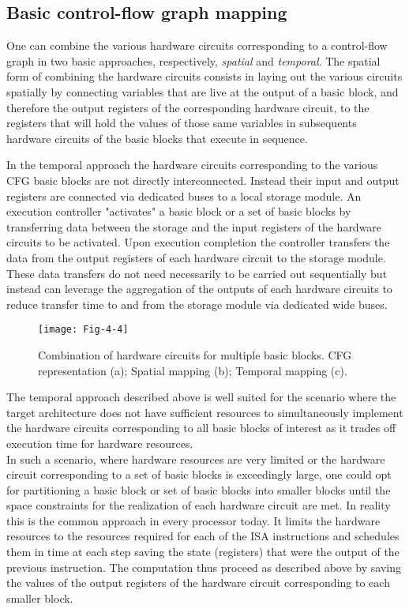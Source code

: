 \subsection{Basic control-flow graph mapping}
\label{sec:cfg_mapping}

One can combine the various hardware circuits corresponding
to a control-flow graph in two basic approaches, respectively,
{\em spatial} and {\em temporal}. 
The spatial form of combining the hardware circuits consists 
in laying out the various circuits spatially by connecting 
variables that are live at the output of a basic block, 
and therefore the output registers of the 
corresponding hardware circuit, to the registers that 
will hold the values of those same variables in subsequents 
hardware circuits of the basic blocks that execute 
in sequence.

In the temporal approach the hardware circuits corresponding
to the various CFG basic blocks are not directly interconnected.
Instead their input and output registers are connected via dedicated
buses to a local storage module. An execution controller "activates"
a basic block or a set of basic blocks by transferring data between
the storage and the input registers of the hardware circuits to be
activated. Upon execution completion the controller transfers the
data from the output registers of each hardware circuit to the storage module.
These data transfers do not need necessarily to be carried out
sequentially but instead can leverage the aggregation of the
outputs of each hardware circuits to reduce transfer
time to and from the storage module via dedicated wide buses.\\

\begin{figure}[htbp]
\centering
\texttt{[image: Fig-4-4]}
\caption{Combination of hardware circuits for multiple basic blocks. 
CFG representation (a); Spatial mapping (b); Temporal mapping (c).}
\label{fig:Fig.4.4}
\end{figure}

The temporal approach described above is well suited for the 
scenario where the target architecture does not have sufficient
resources to simultaneously implement the hardware circuits 
corresponding to all basic blocks of interest as it trades off 
execution time for hardware resources.\\

In such a scenario, where hardware resources are very limited
or the hardware circuit corresponding to a set of basic blocks is 
exceedingly large, one could opt for partitioning a basic block or
set of basic blocks into smaller blocks until the space constraints
for the realization of each hardware circuit are met. In reality
this is the common approach in every processor today. 
It limits the hardware resources to the resources required
for each of the ISA instructions and schedules them in time
at  each step saving the state (registers)
that were the output of the previous instruction.
The computation thus proceed as described above by saving
the values of the output registers of the hardware circuit
corresponding to each smaller block.\\

